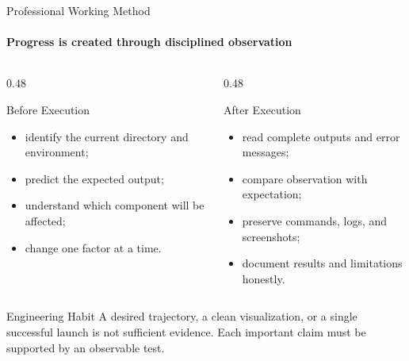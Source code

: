 \begin{frame}{Professional Working Method}
    \framesubtitle{Progress is created through disciplined observation}
    \footnotesize
    \begin{columns}[T,onlytextwidth]
        \begin{column}{0.48\textwidth}
            \begin{block}{Before Execution}
                \begin{itemize}
                    \setlength{\itemsep}{0.22em}
                    \item identify the current directory and environment;
                    \item predict the expected output;
                    \item understand which component will be affected;
                    \item change one factor at a time.
                \end{itemize}
            \end{block}
        \end{column}
        \begin{column}{0.48\textwidth}
            \begin{block}{After Execution}
                \begin{itemize}
                    \setlength{\itemsep}{0.22em}
                    \item read complete outputs and error messages;
                    \item compare observation with expectation;
                    \item preserve commands, logs, and screenshots;
                    \item document results and limitations honestly.
                \end{itemize}
            \end{block}
        \end{column}
    \end{columns}
    \begin{alertblock}{Engineering Habit}
        A desired trajectory, a clean visualization, or a single successful launch is not sufficient evidence. Each important claim must be supported by an observable test.
    \end{alertblock}
\end{frame}

